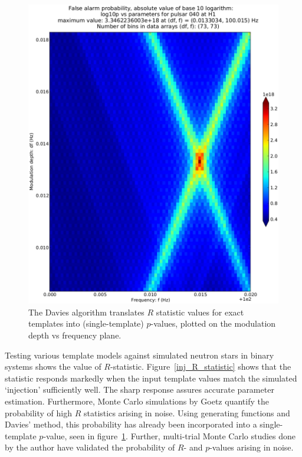 \begin{figure}
\begin{center}
\includegraphics[width=0.8\paperwidth,height=0.62\paperheight]{Prob-4e21-on-4e24.eps}
\caption{The Davies algorithm translates $R$ statistic values for exact templates into (single-template) $p$-values, plotted on the modulation depth vs frequency plane.}
\label{inj_log10p}
\end{center}
\end{figure}

Testing various template models against simulated neutron stars in binary systems shows the value of $R$-statistic.
Figure~\ref{inj_R_statistic} shows that the statistic responds markedly when the input template values match the simulated `injection' sufficiently well.
The sharp response assures accurate parameter estimation.
Furthermore, Monte Carlo simulations by Goetz quantify the probability of high $R$ statistics arising in noise.
Using generating functions and Davies' method, this probability has already been incorporated into a single-template $p$-value, seen in figure~\ref{inj_log10p}.
Further, multi-trial Monte Carlo studies done by the author have validated the probability of $R$- and $p$-values arising in noise.


